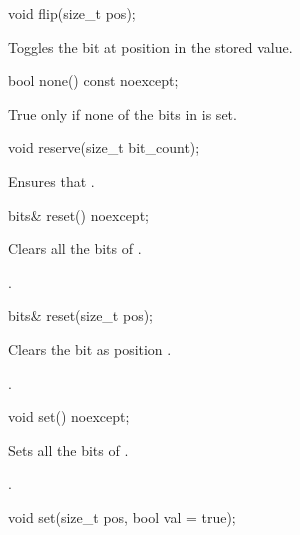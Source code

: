 \begin{addedblock}
\begin{itemdecl}
void flip(size_t pos);	
\end{itemdecl}

\begin{itemdescr}
\effects Toggles the bit at position  in the stored value.
\end{itemdescr}

\begin{itemdecl}
bool none() const noexcept;	
\end{itemdecl}

\begin{itemdescr}
\returns True only if none of the bits in  is set.
\end{itemdescr}

\begin{itemdecl}
void reserve(size_t bit_count);	
\end{itemdecl}

\begin{itemdescr}
\effects Ensures that .	
\end{itemdescr}

\begin{itemdecl}
bits& reset() noexcept;	
\end{itemdecl}

\begin{itemdescr}
\effects Clears all the bits of .

\returns {}.	
\end{itemdescr}

\begin{itemdecl}
bits& reset(size_t pos);	
\end{itemdecl}

\begin{itemdescr}
\effects Clears the bit as position .

\returns {}. 	
\end{itemdescr}

\begin{itemdecl}
void set() noexcept;	
\end{itemdecl}

\begin{itemdescr}
\effects Sets all the bits of .

.	
\end{itemdescr}

\begin{itemdecl}
void set(size_t pos, bool val = true);	
\end{itemdecl}


\end{addedblock}
